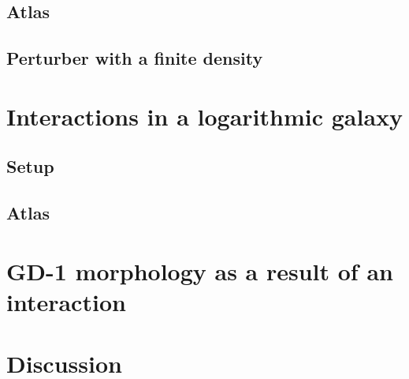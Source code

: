 \documentclass[modern]{aastex62}
\begin{document}
\subsection{Atlas}

\subsection{Perturber with a finite density}


\section{Interactions in a logarithmic galaxy}

\subsection{Setup}

\subsection{Atlas}


\section{GD-1 morphology as a result of an interaction}


\section{Discussion}
\end{document}

